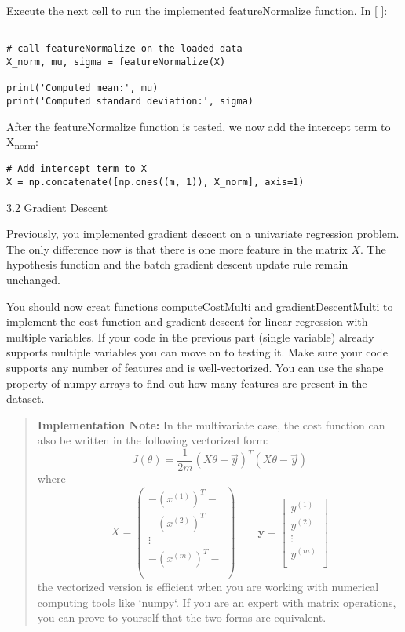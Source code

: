 \documentclass[11pt]{article}
\begin{document}
Execute the next cell to run the implemented featureNormalize function.
In [ ]:
\begin{verbatim}

# call featureNormalize on the loaded data
X_norm, mu, sigma = featureNormalize(X)

print('Computed mean:', mu)
print('Computed standard deviation:', sigma)
\end{verbatim}

After the featureNormalize function is tested, we now add the intercept term to X\textsubscript{norm}:
\begin{verbatim}
# Add intercept term to X
X = np.concatenate([np.ones((m, 1)), X_norm], axis=1)

\end{verbatim}
3.2 Gradient Descent

Previously, you implemented gradient descent on a univariate regression problem. The only difference now is that there is one more feature in the matrix \(X\). The hypothesis function and the batch gradient descent update rule remain unchanged.

You should now creat functions computeCostMulti and gradientDescentMulti to implement the cost function and gradient descent for linear regression with multiple variables. If your code in the previous part (single variable) already supports multiple variables you can move on to testing it. Make sure your code supports any number of features and is well-vectorized. You can use the shape property of numpy arrays to find out how many features are present in the dataset.
\begin{quote}
\textbf{\textbf{Implementation Note:}} In the multivariate case, the cost function can also be written in the following vectorized form: $$ J(\theta) = \frac{1}{2m}(X\theta - \vec{y})^T(X\theta - \vec{y}) $$ where $$ X = \begin{pmatrix} - (x^{(1)})^T - \\ - (x^{(2)})^T - \\ \vdots \\ - (x^{(m)})^T - \\ \\ \end{pmatrix} \qquad \mathbf{y} = \begin{bmatrix} y^{(1)} \\ y^{(2)} \\ \vdots \\ y^{(m)} \\\end{bmatrix}$$ the vectorized version is efficient when you are working with numerical computing tools like `numpy`. If you are an expert with matrix operations, you can prove to yourself that the two forms are equivalent.
\end{quote}
\end{document}
